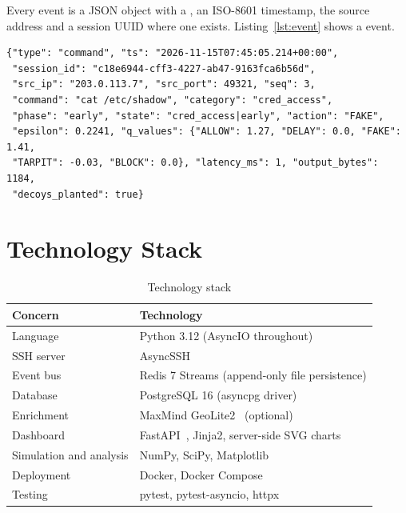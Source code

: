 Every event is a JSON object with a , an ISO-8601 timestamp, the source address
and a session UUID where one exists. Listing~\ref{lst:event} shows a  event.

\begin{lstlisting}[caption={A \code{command} event as written to the stream.}, label={lst:event}]
{"type": "command", "ts": "2026-11-15T07:45:05.214+00:00",
 "session_id": "c18e6944-cff3-4227-ab47-9163fca6b56d",
 "src_ip": "203.0.113.7", "src_port": 49321, "seq": 3,
 "command": "cat /etc/shadow", "category": "cred_access",
 "phase": "early", "state": "cred_access|early", "action": "FAKE",
 "epsilon": 0.2241, "q_values": {"ALLOW": 1.27, "DELAY": 0.0, "FAKE": 1.41,
 "TARPIT": -0.03, "BLOCK": 0.0}, "latency_ms": 1, "output_bytes": 1184,
 "decoys_planted": true}
\end{lstlisting}

\section{Technology Stack}

\begin{table}[H]
\centering
\begin{tabular}{@{}ll@{}}
\toprule
\textbf{Concern} & \textbf{Technology} \\
\midrule
Language & Python 3.12 (AsyncIO throughout) \\
SSH server & AsyncSSH~\cite{asyncssh} \\
Event bus & Redis 7 Streams (append-only file persistence) \\
Database & PostgreSQL 16 (asyncpg driver) \\
Enrichment & MaxMind GeoLite2~\cite{maxmind} (optional) \\
Dashboard & FastAPI~\cite{fastapi}, Jinja2, server-side SVG charts \\
Simulation and analysis & NumPy, SciPy, Matplotlib \\
Deployment & Docker, Docker Compose \\
Testing & pytest, pytest-asyncio, httpx \\
\bottomrule
\end{tabular}
\caption{Technology stack}
\label{tab:stack}
\end{table}
